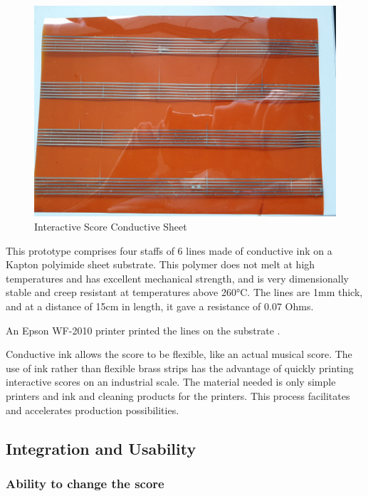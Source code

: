 \begin{figure}[h]
   \centering
   \includegraphics{images/IS_conductive_sheet.jpeg}
   \caption{Interactive Score Conductive Sheet}
   \label{fig:IS_conductive_sheet}
\end{figure}

This prototype comprises four staffs of 6 lines made of conductive ink on a Kapton polyimide sheet substrate. This polymer does not melt at high temperatures and has excellent mechanical strength, and is very dimensionally stable and creep resistant at temperatures above 260°C. The lines are 1mm thick, and at a distance of 15cm in length, it gave a resistance of 0.07 Ohms.

An Epson WF-2010 printer printed the lines on the substrate \cite{adrien2022capacitive_to_notes}.

Conductive ink allows the score to be flexible, like an actual musical score. The use of ink rather than flexible brass strips has the advantage of quickly printing interactive scores on an industrial scale. The material needed is only simple printers and ink and cleaning products for the printers. This process facilitates and accelerates production possibilities.

\subsection{Integration and Usability}

\subsubsection{Ability to change the score}

